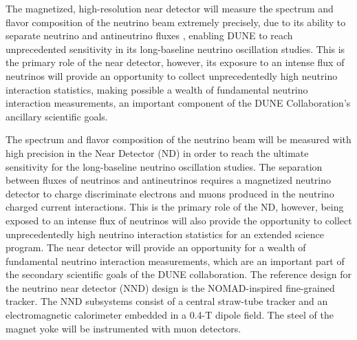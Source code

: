 The magnetized, high-resolution near detector will measure the spectrum 
and flavor composition of the neutrino beam extremely precisely, due to its
ability to separate neutrino and antineutrino  fluxes , enabling DUNE to 
reach unprecedented sensitivity in its long-baseline neutrino
oscillation studies.  
%
This is the primary role of the near detector, however,
its exposure to an intense flux of neutrinos will provide an 
opportunity to collect unprecedentedly high neutrino
interaction statistics, making possible a wealth of fundamental neutrino
interaction measurements, an important component of the DUNE Collaboration's ancillary
scientific goals.


The spectrum and flavor composition of the neutrino beam will be
measured with high precision in the Near Detector (ND) in order to
reach the ultimate sensitivity for the long-baseline neutrino
oscillation studies.  The separation between fluxes of neutrinos and
antineutrinos requires a magnetized neutrino detector to charge
discriminate electrons and muons produced in the neutrino charged
current interactions.  This is the primary role of the ND, however,
being exposed to an intense flux of neutrinos will also provide the
opportunity to collect unprecedentedly high neutrino
interaction statistics for an extended science program.  The near detector will
provide an opportunity for a wealth of fundamental neutrino
interaction measurements, which are an important part of the secondary
scientific goals of the DUNE collaboration.  The reference design for
the neutrino near detector (NND) design is the NOMAD-inspired
fine-grained tracker. The NND subsystems consist of a central
straw-tube tracker and an electromagnetic calorimeter embedded in a
0.4-T dipole field. The steel of the magnet yoke will be instrumented
with muon detectors.

